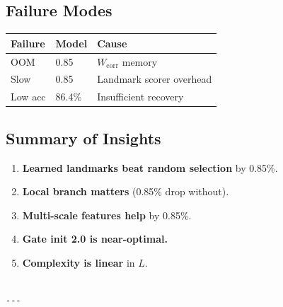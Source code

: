 \subsection{Failure Modes}

\begin{table}[H]
\centering
\small
\begin{tabular}{lll}
\toprule
\textbf{Failure} & \textbf{Model} & \textbf{Cause} \\
\midrule
OOM & 0.85 & $W_\text{corr}$ memory \\
Slow & 0.85 & Landmark scorer overhead \\
Low acc & 86.4\% & Insufficient recovery \\
\bottomrule
\end{tabular}
\end{table}

\subsection{Summary of Insights}

\begin{enumerate}
\item \textbf{Learned landmarks beat random selection} by 0.85\%.
\item \textbf{Local branch matters} (0.85\% drop without).
\item \textbf{Multi-scale features help} by 0.85\%.
\item \textbf{Gate init 2.0 is near-optimal.}
\item \textbf{Complexity is linear} in $L$.
\end{enumerate}
\begin{lstlisting}

---
\end{lstlisting}